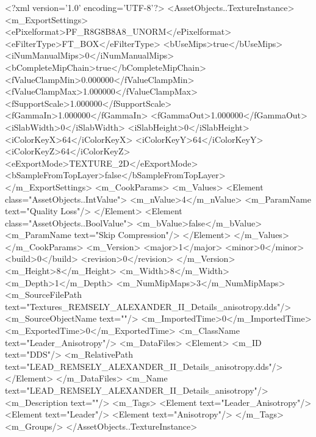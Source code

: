 <?xml version='1.0' encoding='UTF-8'?>
<AssetObjects..TextureInstance>
  <m_ExportSettings>
    <ePixelformat>PF_R8G8B8A8_UNORM</ePixelformat>
    <eFilterType>FT_BOX</eFilterType>
    <bUseMips>true</bUseMips>
    <iNumManualMips>0</iNumManualMips>
    <bCompleteMipChain>true</bCompleteMipChain>
    <fValueClampMin>0.000000</fValueClampMin>
    <fValueClampMax>1.000000</fValueClampMax>
    <fSupportScale>1.000000</fSupportScale>
    <fGammaIn>1.000000</fGammaIn>
    <fGammaOut>1.000000</fGammaOut>
    <iSlabWidth>0</iSlabWidth>
    <iSlabHeight>0</iSlabHeight>
    <iColorKeyX>64</iColorKeyX>
    <iColorKeyY>64</iColorKeyY>
    <iColorKeyZ>64</iColorKeyZ>
    <eExportMode>TEXTURE_2D</eExportMode>
    <bSampleFromTopLayer>false</bSampleFromTopLayer>
  </m_ExportSettings>
  <m_CookParams>
    <m_Values>
      <Element class="AssetObjects..IntValue">
        <m_nValue>4</m_nValue>
        <m_ParamName text="Quality Loss"/>
      </Element>
      <Element class="AssetObjects..BoolValue">
        <m_bValue>false</m_bValue>
        <m_ParamName text="Skip Compression"/>
      </Element>
    </m_Values>
  </m_CookParams>
  <m_Version>
    <major>1</major>
    <minor>0</minor>
    <build>0</build>
    <revision>0</revision>
  </m_Version>
  <m_Height>8</m_Height>
  <m_Width>8</m_Width>
  <m_Depth>1</m_Depth>
  <m_NumMipMaps>3</m_NumMipMaps>
  <m_SourceFilePath text="Textures\LEAD_REMSELY_ALEXANDER_II_Details_anisotropy.dds"/>
  <m_SourceObjectName text=""/>
  <m_ImportedTime>0</m_ImportedTime>
  <m_ExportedTime>0</m_ExportedTime>
  <m_ClassName text="Leader_Anisotropy"/>
  <m_DataFiles>
    <Element>
      <m_ID text="DDS"/>
      <m_RelativePath text="LEAD_REMSELY_ALEXANDER_II_Details_anisotropy.dds"/>
    </Element>
  </m_DataFiles>
  <m_Name text="LEAD_REMSELY_ALEXANDER_II_Details_anisotropy"/>
  <m_Description text=""/>
  <m_Tags>
    <Element text="Leader_Anisotropy"/>
    <Element text="Leader"/>
    <Element text="Anisotropy"/>
  </m_Tags>
  <m_Groups/>
</AssetObjects..TextureInstance>
